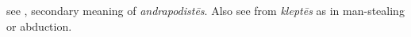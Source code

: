 \item[Kidnapper,]

see , secondary meaning of \emph{andrapodistēs}. Also see  from \emph{kleptēs} as in man-stealing or abduction.
